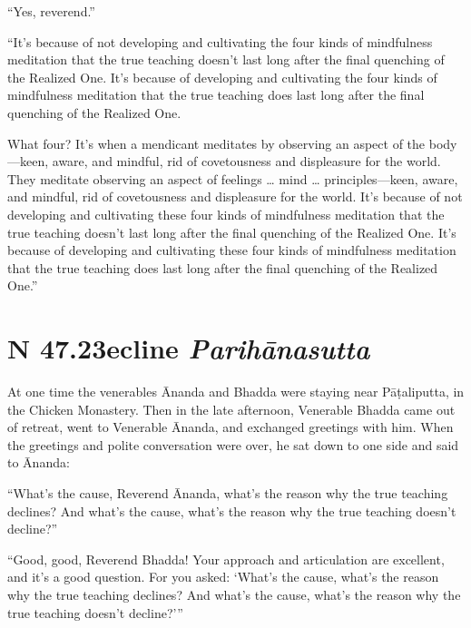 \documentclass[12pt,openany]{book}%
\newcommand*{\suttatitleacronym}[1]{\smaller[2]{#1}\vspace*{.3em}}
\newcommand*{\suttatitletranslation}[1]{\linebreak{#1}}
\newcommand*{\suttatitleroot}[1]{\linebreak\smaller[2]\itshape{#1}}
\newcommand*{\tocacronym}[1]{\hspace*{-3.3em}{#1}\quad}
\newcommand*{\toctranslation}[1]{#1}
\newcommand*{\tocroot}[1]{(\textit{#1})}
\begin{document}
“Yes, reverend.” 

“It’s because of not developing and cultivating the four kinds of mindfulness meditation that the true teaching doesn’t last long after the final quenching of the Realized One. It’s because of developing and cultivating the four kinds of mindfulness meditation that the true teaching does last long after the final quenching of the Realized One. 

What four? It’s when a mendicant meditates by observing an aspect of the body—keen, aware, and mindful, rid of covetousness and displeasure for the world. They meditate observing an aspect of feelings … mind … principles—keen, aware, and mindful, rid of covetousness and displeasure for the world. It’s because of not developing and cultivating these four kinds of mindfulness meditation that the true teaching doesn’t last long after the final quenching of the Realized One. It’s because of developing and cultivating these four kinds of mindfulness meditation that the true teaching does last long after the final quenching of the Realized One.” 

%
\section*{{\suttatitleacronym SN 47.23}{\suttatitletranslation Decline }{\suttatitleroot Parihānasutta}}
\addcontentsline{toc}{section}{\tocacronym{SN 47.23} \toctranslation{Decline } \tocroot{Parihānasutta}}

At one time the venerables Ānanda and Bhadda were staying near \textsanskrit{Pāṭaliputta}, in the Chicken Monastery. Then in the late afternoon, Venerable Bhadda came out of retreat, went to Venerable Ānanda, and exchanged greetings with him. When the greetings and polite conversation were over, he sat down to one side and said to Ānanda: 

“What’s the cause, Reverend Ānanda, what’s the reason why the true teaching declines? And what’s the cause, what’s the reason why the true teaching doesn’t decline?” 

“Good, good, Reverend Bhadda! Your approach and articulation are excellent, and it’s a good question. For you asked: ‘What’s the cause, what’s the reason why the true teaching declines? And what’s the cause, what’s the reason why the true teaching doesn’t decline?’” 
\end{document}
